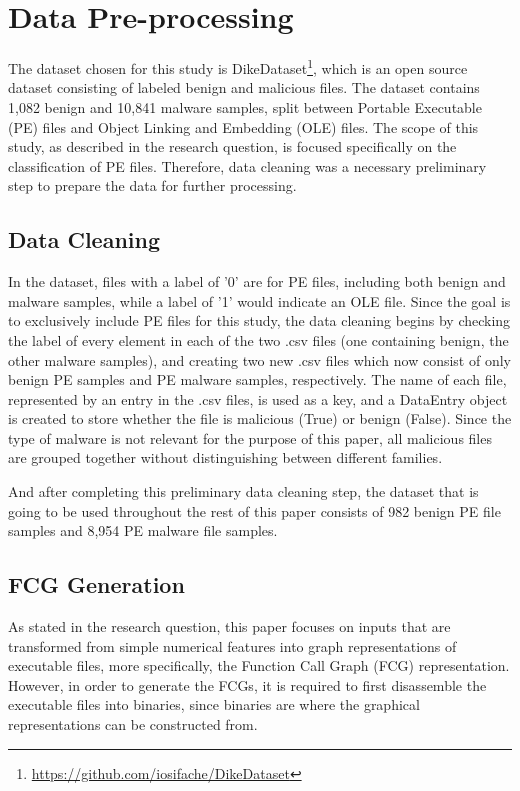 \documentclass[11pt]{article}
\begin{document}
\section{Data Pre-processing}

The dataset chosen for this study is DikeDataset\footnote{\href{https://github.com/iosifache/DikeDataset}{https://github.com/iosifache/DikeDataset}}, which is an open source dataset consisting of labeled benign and malicious files. The dataset contains 1,082 benign and 10,841 malware samples, split between Portable Executable (PE) files and Object Linking and Embedding (OLE) files. The scope of this study, as described in the research question, is focused specifically on the classification of PE files. Therefore, data cleaning was a necessary preliminary step to prepare the data for further processing.

\subsection{Data Cleaning}
In the dataset, files with a label of '0' are for PE files, including both benign and malware samples, while a label of '1' would indicate an OLE file.
Since the goal is to exclusively include PE files for this study, the data cleaning begins by checking the label of every element in each of the two .csv files (one containing benign, the other malware samples), and creating two new .csv files which now consist of only benign PE samples and PE malware samples, respectively. The name of each file, represented by an entry in the .csv files, is used as a key, and a DataEntry object is created to store whether the file is malicious (True) or benign (False). Since the type of malware is not relevant for the purpose of this paper, all malicious files are grouped together without distinguishing between different families.

And after completing this preliminary data cleaning step, the dataset that is going to be used throughout the rest of this paper consists of 982 benign PE file samples and 8,954 PE malware file samples.


\subsection{FCG Generation}
As stated in the research question, this paper focuses on inputs that are transformed from simple numerical features into graph representations of executable files, more specifically, the Function Call Graph (FCG) representation. However, in order to generate the FCGs, it is required to first disassemble the executable files into binaries, since binaries are where the graphical representations can be constructed from. 
\end{document}
